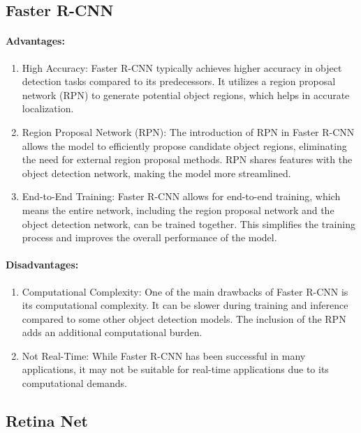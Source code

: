 \documentclass[12pt]{article}
\begin{document}
\subsection{Faster R-CNN}
\paragraph{Advantages:}
\begin{enumerate}[leftmargin=1cm, labelwidth=4cm]
  \item High Accuracy: Faster R-CNN typically achieves higher accuracy in object detection tasks compared to its predecessors. 
  It utilizes a region proposal network (RPN) to generate potential object regions, which helps in accurate localization.
  \item Region Proposal Network (RPN): The introduction of RPN in Faster R-CNN allows the model to efficiently propose candidate object regions, eliminating the need for external region proposal methods. RPN shares features with the object detection network, making the model more streamlined.
  \item End-to-End Training: Faster R-CNN allows for end-to-end training, which means the entire network, including the region proposal network and the object detection network, can be trained together. This simplifies the training process and improves the overall performance of the model.
\end{enumerate}

\paragraph{Disadvantages:}
\begin{enumerate}[leftmargin=1cm, labelwidth=4cm]
  \item Computational Complexity: One of the main drawbacks of Faster R-CNN is its computational complexity.
  It can be slower during training and inference compared to some other object detection models.
The inclusion of the RPN adds an additional computational burden.
  \item Not Real-Time: While Faster R-CNN has been successful in many applications, it may not be suitable for real-time applications due to its computational demands.
\end{enumerate}

\subsection{Retina Net}
\end{document}
